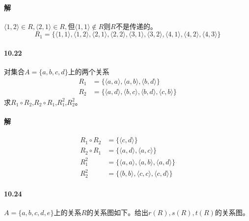 \documentclass[UTF8]{ctexart}
\begin{document}
\paragraph{解}
    $ \langle 1,2 \rangle \in R, \langle 2,1 \rangle \in R, $但$ \langle 1,1 \rangle \notin R$则$R$不是传递的。
    $$R_1 = \{ \langle 1,1 \rangle , \langle 1,2 \rangle , \langle 2,1 \rangle , \langle 2,2 \rangle , \langle 3,1 \rangle , \langle 3,2 \rangle , \langle 4,1 \rangle , \langle 4,2 \rangle , \langle 4,3 \rangle \} $$

\paragraph{10.22} \label{10.22}
    对集合$A= \{ a,b,c,d \} $上的两个关系
    \begin{align*}
        R_1 & = \{ \langle a,a \rangle , \langle a,b \rangle , \langle b,d \rangle \} \\
        R_2 & = \{ \langle a,d \rangle , \langle b,c \rangle , \langle b,d \rangle , \langle c,b \rangle \} 
    \end{align*}
    求$R_1 \circ R_2$,$R_2 \circ R_1$,$R_1^2$,$R_2^2$。

\paragraph{解}
    \begin{align*}
        R_1 \circ R_2 & = \{ \langle c,d \rangle \} \\
        R_2 \circ R_1 & = \{ \langle a,d \rangle , \langle a,c \rangle \} \\
        R_1^2 & = \{ \langle a,a \rangle , \langle a,b \rangle , \langle a,d \rangle \} \\
        R_2^2 & = \{ \langle b,b \rangle , \langle c,c \rangle , \langle c,d \rangle \} 
    \end{align*}

\paragraph{10.24} \label{10.24}
    $A=\{a,b,c,d,e\}$上的关系$R$的关系图如下。给出$r(R),s(R),t(R)$的关系图。
\end{document}
